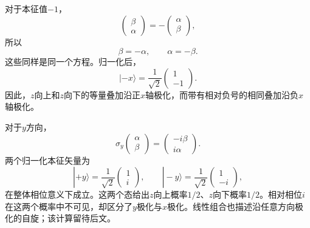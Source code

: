 \begin{classroomqa}
\end{classroomqa}

对于本征值\(-1\)，
\begin{equation}
\begin{pmatrix}
\beta\\
\alpha
\end{pmatrix}
=
-
\begin{pmatrix}
\alpha\\
\beta
\end{pmatrix},
\end{equation}
所以
\begin{equation}
\beta=-\alpha,
\qquad
\alpha=-\beta.
\end{equation}
这些同样是同一个方程。归一化后，
\begin{equation}
|-x\rangle
=
\frac{1}{\sqrt2}
\begin{pmatrix}
1\\
-1
\end{pmatrix}.
\end{equation}
因此，\(z\)向上和\(z\)向下的等量叠加沿正\(x\)轴极化，而带有相对负号的相同叠加沿负\(x\)轴极化。

对于\(y\)方向，
\begin{equation}
\sigma_y
\begin{pmatrix}
\alpha\\
\beta
\end{pmatrix}
=
\begin{pmatrix}
-i\beta\\
i\alpha
\end{pmatrix}.
\end{equation}
两个归一化本征矢量为
\begin{equation}
|+y\rangle
=
\frac{1}{\sqrt2}
\begin{pmatrix}
1\\
i
\end{pmatrix},
\qquad
|-y\rangle
=
\frac{1}{\sqrt2}
\begin{pmatrix}
1\\
-i
\end{pmatrix},
\end{equation}
在整体相位意义下成立。这两个态给出\(z\)向上概率\(1/2\)、\(z\)向下概率\(1/2\)。相对相位\(i\)在这两个概率中不可见，却区分了\(y\)极化与\(x\)极化。线性组合也描述沿任意方向极化的自旋；该计算留待后文。

